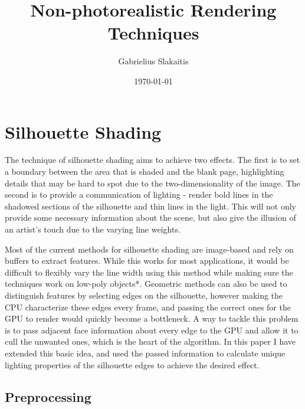 \documentclass[a4paper, 12pt]{article}
\begin{document}
\title{Non-photorealistic Rendering Techniques}
\author{Gabrielius Slakaitis}
\date{\today}
\maketitle

\newpage



\section{Silhouette Shading}

The technique of silhouette shading aims to achieve two effects. The first is to set a boundary between the area that is shaded and the blank page, highlighting details that may be hard to spot due to the two-dimensionality of the image. The second is to provide a communication of lighting - render bold lines in the shadowed sections of the silhouette and thin lines in the light. This will not only provide some necessary information about the scene, but also give the illusion of an artist's touch due to the varying line weights.

Most of the current methods for silhouette shading are image-based and rely on buffers to extract features. While this works for most applications, it would be difficult to flexibly vary the line width using this method while making sure the techniques work on low-poly objects*. Geometric methods can also be used to distinguish features by selecting edges on the silhouette, however making the CPU characterize these edges every frame, and passing the correct ones for the GPU to render would quickly become a bottleneck. A way to tackle this problem is to pass adjacent face information about every edge to the GPU and allow it to cull the unwanted ones, which is the heart of the algorithm. In this paper I have extended this basic idea, and used the passed information to calculate unique lighting properties of the silhouette edges to achieve the desired effect.



\subsection{Preprocessing}
\end{document}
